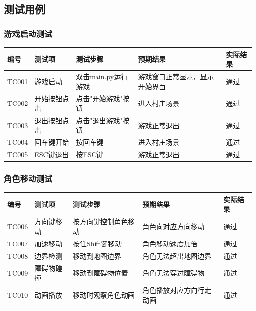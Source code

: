 \documentclass[a4paper,12pt]{article}
\begin{document}
\subsection{测试用例}

\subsubsection{游戏启动测试}
\begin{longtable}{|p{1.5cm}|p{3cm}|p{4cm}|p{4cm}|p{2cm}|}
\hline
编号 & 测试项 & 测试步骤 & 预期结果 & 实际结果 \\
\hline
TC001 & 游戏启动 & 双击main.py运行游戏 & 游戏窗口正常显示，显示开始界面 & 通过 \\
\hline
TC002 & 开始按钮点击 & 点击"开始游戏"按钮 & 进入村庄场景 & 通过 \\
\hline
TC003 & 退出按钮点击 & 点击"退出游戏"按钮 & 游戏正常退出 & 通过 \\
\hline
TC004 & 回车键开始 & 按回车键 & 进入村庄场景 & 通过 \\
\hline
TC005 & ESC键退出 & 按ESC键 & 游戏正常退出 & 通过 \\
\hline
\end{longtable}

\subsubsection{角色移动测试}
\begin{longtable}{|p{1.5cm}|p{3cm}|p{4cm}|p{4cm}|p{2cm}|}
\hline
编号 & 测试项 & 测试步骤 & 预期结果 & 实际结果 \\
\hline
TC006 & 方向键移动 & 按方向键控制角色移动 & 角色向对应方向移动 & 通过 \\
\hline
TC007 & 加速移动 & 按住Shift键移动 & 角色移动速度加倍 & 通过 \\
\hline
TC008 & 边界检测 & 移动到地图边界 & 角色无法超出地图边界 & 通过 \\
\hline
TC009 & 障碍物碰撞 & 移动到障碍物位置 & 角色无法穿过障碍物 & 通过 \\
\hline
TC010 & 动画播放 & 移动时观察角色动画 & 角色播放对应方向行走动画 & 通过 \\
\hline
\end{longtable}
\end{document}
